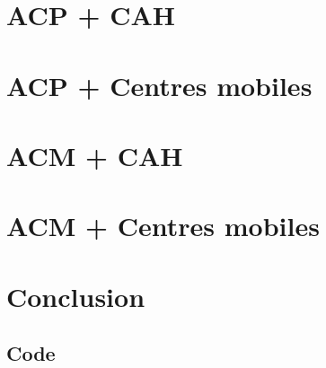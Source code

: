 \documentclass{rapportECL}
\begin{document}
\section{ACP + CAH}


\section{ACP + Centres mobiles}


\section{ACM + CAH}


\section{ACM + Centres mobiles}


\section{Conclusion}


\newpage
\subsection{Code}

\inputminted[linenos=True]{python}{scr/codage.py}

\inputminted[linenos=True]{python}{scr/acp.py}

\inputminted[linenos=True]{python}{scr/acm.py}

\inputminted[linenos=True]{python}{scr/cah.py}

\newpage

\end{document}
